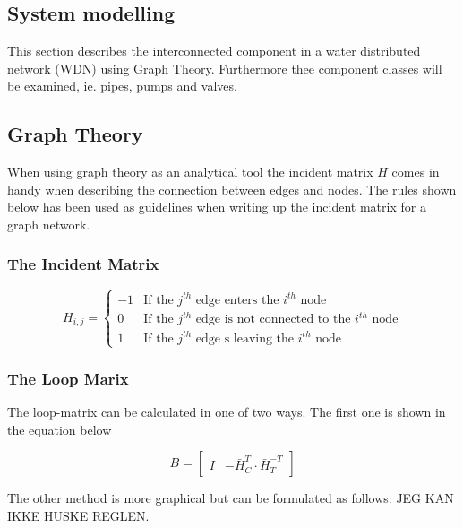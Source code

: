 \subsection{System modelling }
This section describes the interconnected component in a water distributed network (WDN) using Graph Theory. Furthermore thee component classes will be examined, ie. pipes, pumps and valves.


\subsection{Graph Theory}
When using graph theory as an analytical tool the incident matrix $H$ comes in handy when describing the connection between edges and nodes. The rules shown below has been used as guidelines when writing up the incident matrix for a graph network. 

\subsubsection{The Incident Matrix}
\begin{equation*}
	H_{i,j} = \begin{cases}
		-1 & \text{If the $j^{th}$ edge enters the $i^{th}$ node} \\
		0 & \text{If the $j^{th}$ edge is not connected to the $i^{th}$ node} \\
		1 & \text{If the $j^{th}$ edge s leaving the $i^{th}$ node}
	\end{cases}
\end{equation*} %

\subsubsection{The Loop Marix}
The loop-matrix can be calculated in one of two ways. The first one is shown in the equation below

\begin{equation}\label{eq:LoopMatrix}
	B = \begin{bmatrix}
		I & -\bar{H}_{C}^{T}\cdot\bar{H}_{T}^{-T}
	\end{bmatrix}
\end{equation}

The other method is more graphical but can be formulated as follows: JEG KAN IKKE HUSKE REGLEN.

\newpage

